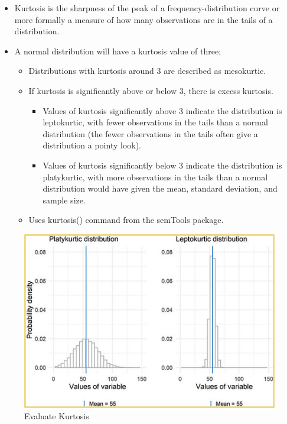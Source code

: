 \documentclass[
  letterpaper,
  DIV=11,
  numbers=noendperiod]{scrreprt}
\providecommand{\tightlist}{%
  \setlength{\itemsep}{0pt}\setlength{\parskip}{0pt}}\usepackage{longtable,booktabs,array}
\begin{document}
\begin{itemize}
\tightlist
\item
  Kurtosis is the sharpness of the peak of a frequency-distribution
  curve or more formally a measure of how many observations are in the
  tails of a distribution.
\item
  A normal distribution will have a kurtosis value of three;

  \begin{itemize}
  \tightlist
  \item
    Distributions with kurtosis around 3 are described as mesokurtic.
  \item
    If kurtosis is significantly above or below 3, there is excess
    kurtosis.

    \begin{itemize}
    \tightlist
    \item
      Values of kurtosis significantly above 3 indicate the distribution
      is leptokurtic, with fewer observations in the tails than a normal
      distribution (the fewer observations in the tails often give a
      distribution a pointy look).
    \item
      Values of kurtosis significantly below 3 indicate the distribution
      is platykurtic, with more observations in the tails than a normal
      distribution would have given the mean, standard deviation, and
      sample size.
    \end{itemize}
  \item
    Uses kurtosis() command from the semTools package.
  \end{itemize}
\end{itemize}

\begin{figure}[H]

{\centering \includegraphics{Pictures/Ch2/Kurtosis.png}

}

\caption{Evaluate Kurtosis}

\end{figure}%
\end{document}
